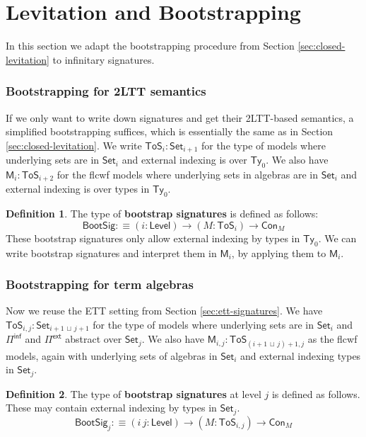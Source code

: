 \documentclass[12pt,a4paper,twoside,openany]{book}
\theoremstyle{remark}
\theoremstyle{definition}
\newtheorem{mydefinition}{Definition}
\theoremstyle{theorem}
\newcommand{\ms}[1]{\mathsf{#1}}
\newcommand{\bs}[1]{\boldsymbol{#1}}
\newcommand{\Con}{\mathsf{Con}}
\newcommand{\Ty}{\mathsf{Ty}}
\newcommand{\Set}{\mathsf{Set}}
\newcommand{\ToS}{\mathsf{ToS}}
\newcommand{\Pie}{\Pi^{\mathsf{ext}}}
\newcommand{\Piinf}{\Pi^{\mathsf{inf}}}
\newcommand{\bM}{\bs{\mathsf{M}}}
\newcommand{\defn}{:\equiv}
\newcommand{\lub}{\,\sqcup\,}
\begin{document}
\section{Levitation and Bootstrapping}
\label{sec:iqii-levitation}

In this section we adapt the bootstrapping procedure from Section
\ref{sec:closed-levitation} to infinitary signatures.

\subsubsection{Bootstrapping for 2LTT semantics}

If we only want to write down signatures and get their 2LTT-based semantics, a
simplified bootstrapping suffices, which is essentially the same as in Section
\ref{sec:closed-levitation}. We write $\ToS_i : \Set_{i+1}$ for the type of
models where underlying sets are in $\Set_i$ and external indexing is over
$\Ty_0$.  We also have $\bM_{i} : \ToS_{i + 2}$ for the flcwf models where
underlying sets in algebras are in $\Set_i$ and external indexing is over types
in $\Ty_0$.

\begin{mydefinition} The type of \textbf{bootstrap signatures} is defined as follows:
\[
  \ms{BootSig} \defn (i : \ms{Level}) \to (M : \ToS_{i}) \to \Con_{M}
\]
These bootstrap signatures only allow external indexing by types in $\Ty_0$.  We
can write bootstrap signatures and interpret them in $\bM_i$, by applying them
to $\bM_i$.
\end{mydefinition}

\subsubsection{Bootstrapping for term algebras}

Now we reuse the ETT setting from Section \ref{sec:ett-signatures}. We have
$\ToS_{i,j} : \Set_{i+1\lub j+1}$ for the type of models where underlying sets
are in $\Set_i$ and $\Piinf$ and $\Pie$ abstract over $\Set_j$. We also have
$\bM_{i,j} : \ToS_{(i+1\lub j)+1,j}$ as the flcwf models, again with underlying
sets of algebras in $\Set_i$ and external indexing types in $\Set_j$.

\begin{mydefinition} The type of \textbf{bootstrap signatures} at level $j$ is defined as follows.
These may contain external indexing by types in $\Set_j$.
\[
  \ms{BootSig}_j \defn (i\,j : \ms{Level}) \to (M : \ToS_{i,j}) \to \Con_{M}
\]
\end{mydefinition}
\end{document}
